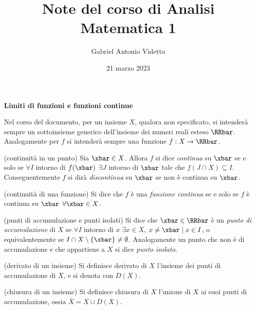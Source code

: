 \documentclass[11pt]{article}
\title{\textbf{Note del corso di Analisi Matematica 1}}
\author{Gabriel Antonio Videtta}
\date{21 marzo 2023}
\begin{document}
	
	\maketitle
	
	\begin{center}
		\Large \textbf{Limiti di funzioni e funzioni continue}
	\end{center}
	
	\begin{note} Nel corso del documento, per un insieme $X$, qualora non
		specificato, si intenderà sempre un sottoinsieme generico dell'insieme
		dei numeri reali esteso $\RRbar$. Analogamente per $f$ si intenderà
		sempre una funzione $f : X \to \RRbar$.
	\end{note}
	
	\begin{definition} (continuità in un punto) Sia
		$\xbar \in X$. Allora $f$ si dice \textit{continua} su $\xbar$ se e solo
		se $\forall I$ intorno di $f(\xbar)$ $\exists J$ intorno di $\xbar$ tale
		che $f(J \cap X) \subseteq I$. Conseguentemente $f$ si dirà \textit{discontinua}
		su $\xbar$ se non è continua su $\xbar$.
	\end{definition}
	
	\begin{definition} (continuità di una funzione) Si dice che $f$ è una \textit{funzione 
			continua} se e solo se $f$ è continua su $\xbar$ $\forall \xbar \in X$.
	\end{definition}
	
	\begin{definition} (punti di accumulazione e punti isolati) Si dice che $\xbar \in \RRbar$ è un \textit{punto
			di accumulazione} di $X$ se $\forall I$ intorno di $x$ $\exists x \in X$, $x \neq \xbar \mid
		x \in I$, o equivalentemente se $I \cap X \setminus \{\xbar\} \neq \emptyset$. Analogamente
		un punto che non è di accumulazione e che appartiene a $X$ si dice \textit{punto isolato}.
	\end{definition}
	
	\begin{definition}
		(derivato di un insieme) Si definisce derivato di $X$ l'insieme dei punti di
		accumulazione di $X$, e si denota con $D(X)$.
	\end{definition}
	
	\begin{definition}
		(chiusura di un insieme) Si definisce chiusura di $X$ l'unione di $X$ ai suoi
		punti di accumulazione, ossia $\bar{X} = X \cup D(X)$.
	\end{definition}
	
\end{document}
